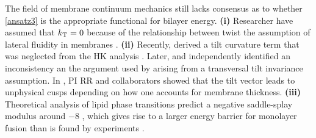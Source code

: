 
The field of membrane continuum mechanics still lacks consensus as to whether \eqref{ansatz3} is the appropriate functional for bilayer energy.
\textbf{(i)} Researcher have assumed that $k_{\mathrm{T}} = 0$ because of the relationship between twist the assumption of lateral fluidity in membranes 
\cite{Hamm2000, TerziDeserno17, C9SM02079A, PhysRevE.102.042406}. 
\textbf{(ii)}
Recently, \cite{TerziDeserno17} derived a tilt curvature term that was neglected from the HK analysis \cite{Hamm2000}.
Later, \cite{C9SM02079A} 
and \cite{PhysRevE.102.042406} independently identified an inconsistency an the argument used by \cite{TerziDeserno17} arising
from a transversal tilt invariance assumption.
In \cite{RyKlYaCo16}, PI RR and collaborators showed that the tilt vector leads to unphysical cusps depending on how one accounts for membrane thickness.  
  \textbf{(iii)}
  Theoretical analysis of lipid phase transitions predict a negative saddle-splay modulus around $-8$ \kBT\;
\cite{SIEGEL2004366,SIEGEL20085200}, which gives rise to a larger energy barrier for monolayer fusion than is found by experiments \cite{FrRoPi17,Tran7106,TerziDeserno17}.
%
%


